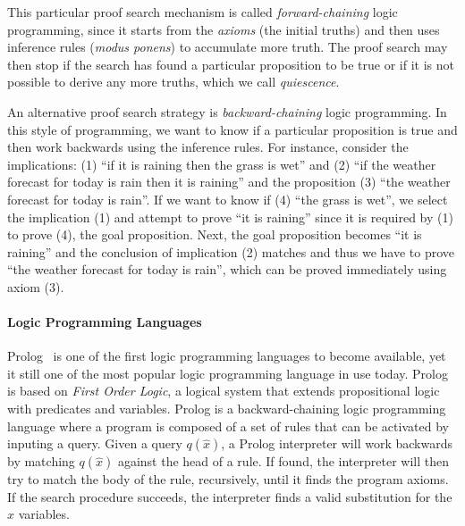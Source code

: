 This particular proof search mechanism is called \emph{forward-chaining} logic
programming, since it starts from the \emph{axioms} (the initial truths) and
then uses inference rules (\emph{modus ponens}) to accumulate more truth. The
proof search may then stop if the search has found a particular proposition to
be true or if it is not possible to derive any more truths, which we call
\emph{quiescence}.

An alternative proof search strategy is \emph{backward-chaining} logic
programming. In this style of programming, we want to know if a particular
proposition is true and then work backwards using the inference rules. For
instance, consider the implications: (1) ``if it is raining then the grass
is wet'' and (2) ``if the weather forecast for today is rain then it is raining''
and the proposition (3) ``the weather forecast for today is rain''. If we want
to know if (4) ``the grass is wet'', we select the implication (1) and attempt to prove
``it is raining'' since it is required by (1) to prove (4), the goal
proposition. Next, the goal proposition becomes ``it is raining'' and the
conclusion of implication (2) matches and thus we have to prove ``the weather
forecast for today is rain'', which can be proved immediately using axiom (3).

\paragraph{Logic Programming Languages}

Prolog~\cite{Colmerauer:1993:BP:154766.155362} is one of the first logic
programming languages to become available, yet it still one of the most popular
logic programming language in use today. Prolog is based on \emph{First Order
Logic}, a logical system that extends propositional logic with predicates and
variables. Prolog is a backward-chaining logic programming language where a
program is composed of a set of rules that can be activated by inputing a query.
Given a query $q(\hat{x})$, a Prolog interpreter will work backwards by matching
$q(\hat{x})$ against the head of a rule. If found, the interpreter will then try
to match the body of the rule, recursively, until it finds the program axioms.
If the search procedure succeeds, the interpreter finds a valid substitution for
the $\hat{x}$ variables.

